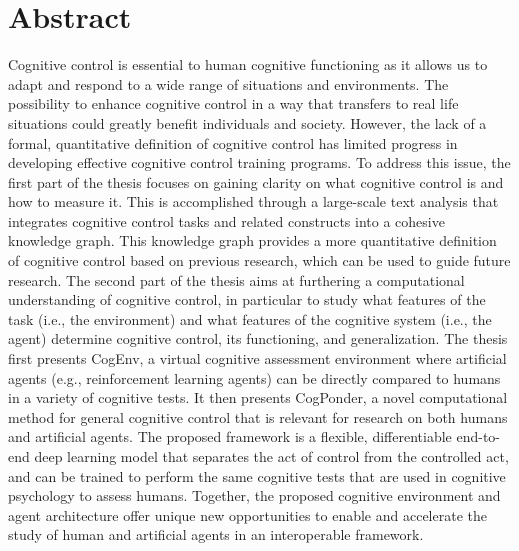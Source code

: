 
\section*{Abstract}
 
Cognitive control is essential to human cognitive functioning as it allows us to adapt and respond to a wide range of situations and environments. The possibility to enhance cognitive control in a way that transfers to real life situations could greatly benefit individuals and society. However, the lack of a formal, quantitative definition of cognitive control has limited progress in developing effective cognitive control training programs. To address this issue, the first part of the thesis focuses on gaining clarity on what cognitive control is and how to measure it. This is accomplished through a large-scale text analysis that integrates cognitive control tasks and related constructs into a cohesive knowledge graph. This knowledge graph provides a more quantitative definition of cognitive control based on previous research, which can be used to guide future research. The second part of the thesis aims at furthering a computational understanding of cognitive control, in particular to study what features of the task (i.e., the environment) and what features of the cognitive system (i.e., the agent) determine cognitive control, its functioning, and generalization. The thesis first presents CogEnv, a virtual cognitive assessment environment where artificial agents (e.g., reinforcement learning agents) can be directly compared to humans in a variety of cognitive tests. It then presents CogPonder, a novel computational method for general cognitive control that is relevant for research on both humans and artificial agents. The proposed framework is a flexible, differentiable end-to-end deep learning model that separates the act of control from the controlled act, and can be trained to perform the same cognitive tests that are used in cognitive psychology to assess humans. Together, the proposed cognitive environment and agent architecture offer unique new opportunities to enable and accelerate the study of human and artificial agents in an interoperable framework.

